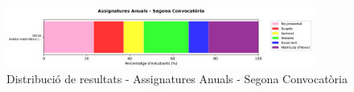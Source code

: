 \documentclass[12pt,a4paper]{article}
\begin{document}
\begin{figure}[H]
\centering
\includegraphics[width=0.9\textwidth]{graficos/barras_A2.png}
\caption{Distribució de resultats - Assignatures Anuals - Segona Convocatòria}
\end{figure}

\clearpage
\end{document}
